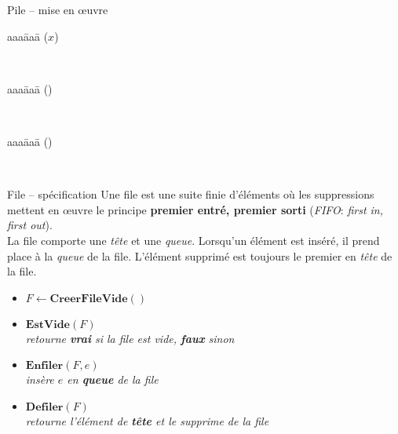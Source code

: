 \begin{frame}{Pile -- mise en {\oe}uvre}

\begin{tabbing}
  aaa\=aaa\=\kill
  ($x$) \\
  \end{tabbing}

~\\

\begin{tabbing}
  aaa\=aaa\=\kill
  () \\
\end{tabbing}

~\\
\begin{tabbing}
  aaa\=aaa\=\kill
  () \\
  \end{tabbing}
~\\

\end{frame}


\begin{frame}{File -- spécification}
Une file est une suite finie d'éléments où les suppressions mettent en {\oe}uvre le principe \textbf{premier entré, premier sorti} (\emph{FIFO}: \emph{first in, first out}).\\
La file comporte une \emph{tête} et une \emph{queue}. Lorsqu’un élément est inséré, il prend place à la  \emph{queue} de la file. L’élément supprimé est toujours le premier en  \emph{tête} de la file.

  \begin{itemize}
  \item $F \leftarrow \mathbf{CreerFileVide()}$
  \item $\mathbf{EstVide}(F)$ \\
    \emph{retourne \textbf{vrai} si la file est vide, \textbf{faux} sinon}
  \item $\mathbf{Enfiler}(F,e)$ \\
    \emph{insère $e$ en \textbf{queue} de la file}
  \item $\mathbf{Defiler}(F)$ \\
    \emph{retourne l'élément de \textbf{tête}  et le
      supprime de la file}
  \end{itemize}
\end{frame}

